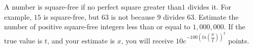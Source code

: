 A number is square-free if no perfect square greater than$ 1$ divides it. For example, $15$ is square-free, but $63$ is not because $9$ divides $63$. Estimate the number of positive square-free integers less than or equal to $1, 000, 000$. If the true value is $t$, and your estimate is $x$, you will receive $10e^{-100(ln( \dfrac{x}{t} ))^2}$ points.
